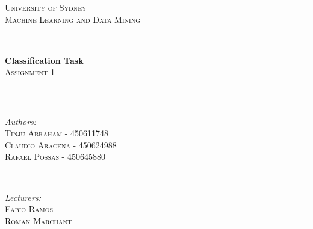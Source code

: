 \documentclass[letterpaper,10pt]{article}
\theoremstyle{mytheor}
\begin{document}
\begin{titlepage}

\newcommand{\HRule}{\rule{\linewidth}{0.5mm}} %

\center %
 

\textsc{\LARGE University of Sydney}\\[1.5cm] %

\textsc{\Large Machine Learning and Data Mining}\\[0.5cm] %


\HRule \\[0.4cm]
{ \huge \bfseries Classification Task}\\[0.4cm] %
\textsc{\Large Assignment 1}\\[0.5cm]
\HRule \\[1.5cm]
 

\begin{minipage}{0.4\textwidth}
\begin{flushleft} \large
\emph{Authors:}\\
\textsc{Tinju Abraham - 450611748\\		
		Claudio Aracena - 450624988\\
		Rafael Possas - 450645880} %
\end{flushleft}
\end{minipage}
~
\begin{minipage}{0.4\textwidth}
\begin{flushright} \large
\emph{Lecturers:} \\
 \textsc{Fabio Ramos\\
 		 Roman Marchant} %
\end{flushright}
\end{minipage}\\[4cm]


\end{titlepage}
\end{document}
